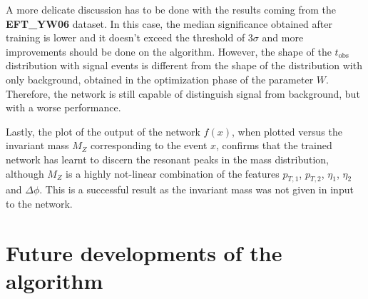 A more delicate discussion has to be done with the results coming from the \textbf{EFT\_YW06} dataset. In this case, the median significance obtained after training is lower and it doesn't exceed the threshold of $3\sigma$ and more improvements should be done on the algorithm. However, the shape of the $t_\mathrm{obs}$ distribution with signal events is different from the shape of the distribution with only background, obtained in the optimization phase of the parameter $W$. Therefore, the network is still capable of distinguish signal from background, but with a worse performance.

Lastly, the plot of the output of the network $f(x)$, when plotted versus the invariant mass $M_{Z}$ corresponding to the event $x$, confirms that the trained network has learnt to discern the resonant peaks in the mass distribution, although $M_{Z}$ is a highly not-linear combination of the features $p_{T,1}$, $p_{T,2}$, $\eta_{1}$, $\eta_{2}$ and $\Delta \phi$. This is a successful result as the invariant mass was not given in input to the network.





\section{Future developments of the algorithm}
\label{sec:FUTURE_DEVELOPMENTS}
